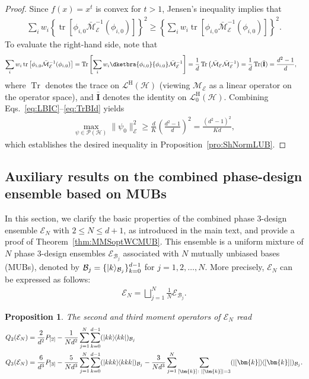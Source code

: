 \documentclass[aps,pra,twocolumn,nofootinbib,superscriptaddress,10pt]{revtex4-2}
\newtheorem{proposition}{Proposition}
\DeclarePairedDelimiter{\ket}{\lvert}{\rangle}
\DeclarePairedDelimiter{\bra}{\langle}{\rvert}
\newcommand{\ketbra}[2]{\ket{#1}\mkern-2mu\bra{#2}}
\newcommand{\proj}[1]{\ketbra{#1}{#1}}
\newcommand{\dproj}[1]{\dketbra{#1}{#1}}
\DeclareMathOperator{\tr}{tr}
\DeclareMathOperator{\Tr}{Tr}
\newcommand{\bfI}{\mathbf{I}}
\newcommand{\bmk}{\bm{k}}
\newcommand{\caB}{\mathcal{B}}
\newcommand{\caE}{\mathcal{E}}
\newcommand{\caH}{\mathcal{H}}
\newcommand{\caL}{\mathcal{L}}
\newcommand{\caM}{\mathcal{M}}
\newcommand{\caP}{\mathcal{P}}
\newcommand{\rmH}{\mathrm{H}}
\newcommand{\bbfI}{\bar{\bfI}}
\newcommand{\bcaM}{\bar{\mathcal{M}}}
\newcommand{\pref}[1]{Proposition~\ref{#1}}
\newcommand{\thref}[1]{Theorem~\ref{#1}}
\begin{document}
\begin{proof}
Since $f(x)=x^t$ is convex for $t>1$, Jensen's inequality implies that
\begin{align}
\sum_i w_i \left\{\tr\left[\phi_{i,0}\bcaM_\caE^{-1}(\phi_{i,0}) \right]\right\}^2 \ge \left\{\sum_i w_i \tr\left[\phi_{i,0}\bcaM_\caE^{-1}(\phi_{i,0}) \right]\right\}^2.\label{eq:Jensen}
\end{align}
To evaluate the right-hand side, note that
\begin{align}
\sum_i w_i \tr\left[\phi_{i,0}\bcaM_\caE^{-1}(\phi_{i,0}) \right] &= \Tr\left[\sum_i w_i \dproj{\phi_{i,0}}\bcaM_\caE^{-1}\right] = \frac{1}{d}\Tr\left(\bcaM_\caE \bcaM_\caE^{-1}\right) = \frac{1}{d}\Tr(\bbfI)=\frac{d^2-1}{d}, \label{eq:TrBId}
\end{align}
where $\Tr$ denotes the trace on $\caL^{\rmH}(\caH)$ (viewing $\caM_\caE$ as a linear operator on the operator space), and $\bbfI$ denotes the identity on $\caL^{\rmH}_0(\caH)$. Combining Eqs.~\eqref{eq:LBIC}--\eqref{eq:TrBId} yields
\begin{align}
\max_{\psi\in \caP(\caH)} \|\psi_0\|_\caE^2 \ge \frac{d}{K}\left(\frac{d^2-1}{d}\right)^2 = \frac{(d^2-1)^2}{Kd},
\end{align}
which establishes the desired inequality in \pref{pro:ShNormLUB}.
\end{proof}

\subsection{Auxiliary results on the combined phase-design ensemble based on MUBs}
In this section, we clarify the basic properties of the combined phase 3-design ensemble $\caE_N$ with $2\le N\le d+1$, as introduced in the main text, and provide a proof of \thref{thm:MMSoptWCMUB}. This ensemble is a uniform mixture of $N$  phase 3-design ensembles $\caE_{\caB_j}$ associated with $N$ mutually unbiased bases (MUBs), denoted by $\caB_j=\{\ket{k}_{\caB_j}\}_{k=0}^{d-1}$ for $j=1,2,\ldots,N$. More precisely, $\caE_N$ can be expressed as follows:
\begin{align}
    \caE_N = \bigsqcup_{j=1}^{N} \frac{1}{N}\caE_{\caB_j}.
\end{align}


\begin{proposition}
\label{pro:AMoment}
The second and third moment operators of $\caE_N$ read
\begin{align}
    Q_2(\caE_N) &= \frac{2}{d^2}P_{[2]} -\frac{1}{Nd^2}\sum_{j=1}^{N}\sum_{k=0}^{d-1}(\proj{kk})_{\caB_j}
\label{eq:2ndMA}\\
    Q_3(\caE_N) &= \frac{6}{d^3}P_{[3]} -\frac{5}{Nd^3}\sum_{j=1}^{N}\sum_{k=0}^{d-1}(\proj{kkk})_{\caB_j} -\frac{3}{Nd^3}\sum_{j=1}^{N}\sum_{[\bmk]\colon |[\bmk]|=3} (\proj{[\bmk]})_{\caB_j}. \label{eq:3ndMA}
\end{align}
\end{proposition}
\end{document}
